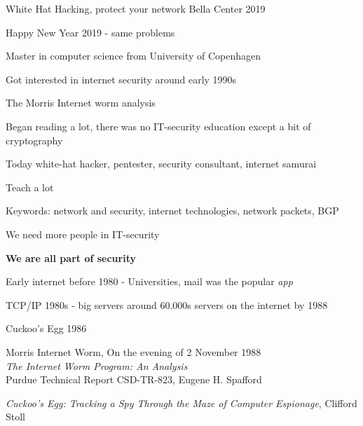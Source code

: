 \documentclass[Screen16to9,17pt,footrule]{foils}
\begin{document}
\mytitlepage
{White Hat Hacking, protect your network}
{Bella Center 2019}

\centerline{Happy New Year 2019 - same problems}



\begin{list2}
\item Master in computer science from University of Copenhagen
\item Got interested in internet security around early 1990s
\item The Morris Internet worm analysis
\item Began reading a lot, there was no IT-security education except a bit of cryptography
\item Today white-hat hacker, pentester, security consultant, internet samurai
\item Teach a lot
\item Keywords: network and security, internet technologies, network packets, BGP
\item We need more people in IT-security
\end{list2}

\vskip 5mm
\centerline{\bf\Large We are all part of security}


\begin{list2}
\item Early internet before 1980 - Universities, mail was the popular \emph{app}
\item TCP/IP 1980s - big servers around 60.000s servers on the internet by 1988
\item Cuckoo's Egg 1986
\item Morris Internet Worm, On the evening of 2 November 1988\\
\emph{The Internet Worm Program: An Analysis}\\
Purdue Technical Report CSD-TR-823, Eugene H. Spafford

\end{list2}



\begin{list2}
\item
\emph{Cuckoo's Egg: Tracking a Spy Through the Maze of Computer
 Espionage},  Clifford Stoll
\end{list2}
\end{document}
